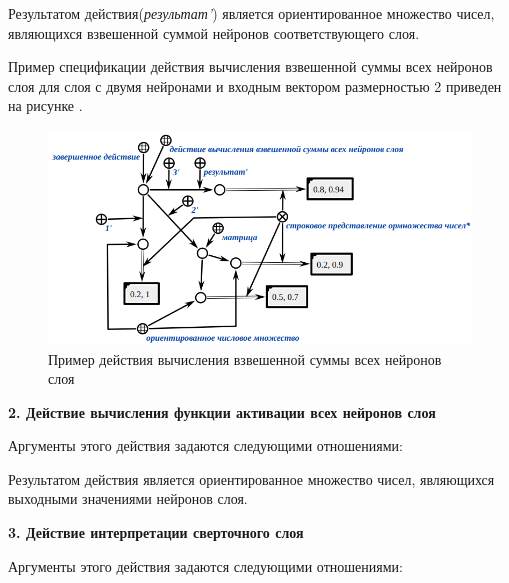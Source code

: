 Результатом действия(\textit{результат'}) является ориентированное множество чисел, являющихся взвешенной суммой нейронов соответствующего слоя.

Пример спецификации действия вычисления взвешенной суммы всех нейронов слоя для слоя с двумя нейронами и входным вектором размерностью 2 приведен на рисунке \textit{}.

\begin{figure}
	\centering
	\includegraphics[width=0.95\linewidth]{author/part3/figures/action_weighted_sum.png}
	\caption{Пример действия вычисления взвешенной суммы всех нейронов слоя}
	\label{fig:action_weighted_sum}
\end{figure}


\textbf{2. Действие вычисления функции активации всех нейронов слоя}

Аргументы этого действия задаются следующими отношениями:
\begin{SCn}


\end{SCn}

Результатом действия является ориентированное множество чисел, являющихся выходными значениями нейронов слоя.


\textbf{3. Действие интерпретации сверточного слоя}

Аргументы этого действия задаются следующими отношениями:
\begin{SCn}


\end{SCn}

